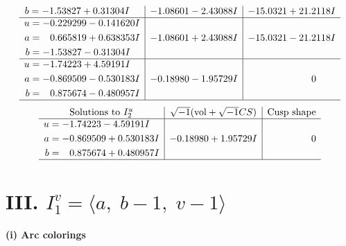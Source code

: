 \documentclass[1p]{elsarticle_modified}
\theoremstyle{definition}
\newcommand{\I}{\sqrt{-1}}
\begin{document}
$$\begin{array}{c|c|c}
\begin{aligned}
b &= -1.53827 + 0.31304 I\end{aligned}
 & -1.08601 - 2.43088 I & -15.0321 + 21.2118 I \\ \hline\begin{aligned}
u &= -0.229299 - 0.141620 I \\
a &= \phantom{-}0.665819 + 0.638353 I \\
b &= -1.53827 - 0.31304 I\end{aligned}
 & -1.08601 + 2.43088 I & -15.0321 - 21.2118 I \\ \hline\begin{aligned}
u &= -1.74223 + 4.59191 I \\
a &= -0.869509 - 0.530183 I \\
b &= \phantom{-}0.875674 - 0.480957 I\end{aligned}
 & -0.18980 - 1.95729 I & \phantom{-0.000000 } 0\\
 \hline 
 \end{array}$$\newpage$$\begin{array}{c|c|c}  
\text{Solutions to }I^u_{2}& \I (\text{vol} + \sqrt{-1}CS) & \text{Cusp shape}\\
 \hline 
\begin{aligned}
u &= -1.74223 - 4.59191 I \\
a &= -0.869509 + 0.530183 I \\
b &= \phantom{-}0.875674 + 0.480957 I\end{aligned}
 & -0.18980 + 1.95729 I & \phantom{-0.000000 } 0\\
 \hline 
 \end{array}$$\newpage\newpage\renewcommand{\arraystretch}{1}
\centering \section*{III. $I^v_{1}= \langle a,\;b-1,\;v-1 \rangle$}
\flushleft \textbf{(i) Arc colorings}\\
\end{document}
